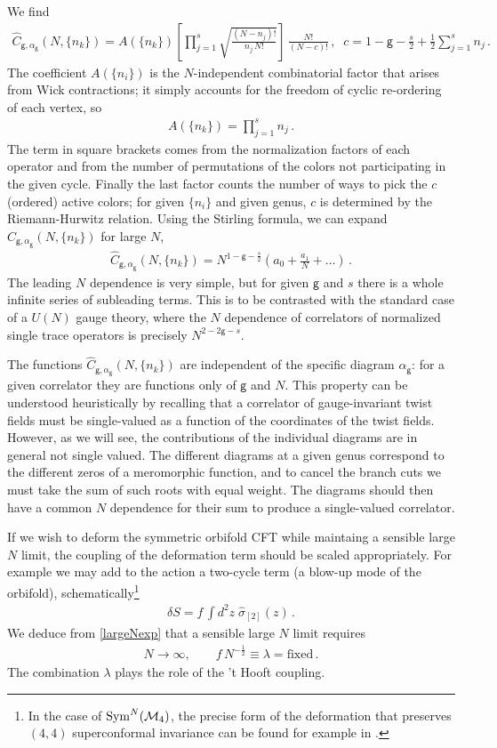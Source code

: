 \documentclass[letterpaper]{JHEP3}
\def\s{\sigma}
\def\a{\alpha}
\def\half{{\frac12}}
\def\be{\begin{equation}}
\def\ee{\end{equation}}
\def\a{\alpha}
\def\be{\begin{eqnarray}}
\def\ee{\end{eqnarray}}
\def\gg{\mathsf g }
\begin{document}
 We find
\be\label{largeNexp}
\hat {C}_{\gg,\a_\gg}(N,\{n_k\})
=A( \{ n_k \} )  \left[\prod_{j=1}^s\sqrt{\frac{(N-n_j)!}{n_j\,N!}}
\right]\,\frac{N!}{(N-c)!} \, , \;\; c = 1-\gg -\frac{s}{2} + \frac{1}{2} \sum_{j=1}^s n_j \,. 
\ee 
The coefficient $A( \{ n_i \} )$ is the  $N$-independent combinatorial factor that arises from Wick contractions;
it simply accounts for the freedom of cyclic re-ordering of each vertex, so
\be
A( \{ n_k \} ) = \prod_{j=1}^s n_j \,.
\ee
The term in square brackets  comes from the normalization factors of each operator and  from the number of permutations of the colors not participating in the given cycle.  Finally the last factor counts the number of ways to pick the $c$ (ordered) active colors; for given
$\{ n_i \}$ and given genus, $c$ is determined by the Riemann-Hurwitz relation.  Using the Stirling formula, we can
expand $\hat {C}_{\gg,\a_\gg}(N,\{n_k\})$ for large $N$,
\be
\hat {C}_{\gg,\a_\gg}(N,\{n_k\}) =  N^{1-\gg - \frac{s}{2}}  \left( a_0  + \frac{a_1}{N} + \dots \right) \,.
\ee
The leading $N$ dependence is very simple, but for given $\gg$ and $s$ there is a whole infinite series of subleading terms.
This is to be contrasted with the standard case of a $U(N)$ gauge theory, where the $N$ dependence
of correlators of normalized single trace operators is precisely $N^{2-2\gg - s}$. 

The functions $\hat C_{\gg,\a_\gg}(N,\{n_k\})$ are  independent of the specific diagram
$\a_\gg$: for a given correlator they are functions only of $\gg$ and $N$. This property can be understood
heuristically by recalling that
 a correlator of gauge-invariant twist fields must be single-valued
as a function of the  coordinates of the twist fields. However, as we will see, the contributions of the individual diagrams
 are in general not single valued. The different diagrams at a given genus 
 correspond to  the different zeros of a meromorphic function, and  to cancel
 the branch cuts we must  take the sum of such roots with equal weight. The
 diagrams should then have  a common $N$ dependence for their sum to produce a single-valued
 correlator.




If we wish to deform the symmetric orbifold CFT while maintaing
a sensible large $N$ limit,  the coupling of the deformation term should be scaled appropriately.
For example we may add to the action a two-cycle term (a blow-up mode of the orbifold),
schematically\footnote{In the case of ${\rm Sym}^N ({\cal M}_4)$, the precise form of the deformation 
that preserves $(4,4)$ superconformal invariance can be found for example in \cite{Gava:2002xb}.} 
\be
\delta S = f \, \int d^2z\; \hat \s_{[2]}(z) \,.
\ee 
We deduce from \eqref{largeNexp}  that
a sensible large $N$ limit requires 
\be
N\to\infty,\qquad f \, N^{-\half}\equiv\lambda =\text{fixed} \, .
\ee 
The combination $\lambda$ plays the role of  the 't Hooft coupling. 
\end{document}
